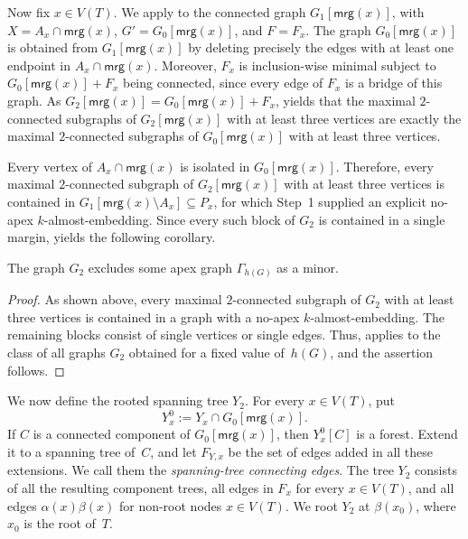 \documentclass[1p,number,11pt]{elsarticle}
\theoremstyle{plain}
\newcommand{\mrg}{\mathsf{mrg}}
\begin{document}
Now fix $x\in V(T)$.
We apply  to the connected graph $G_1[\mrg(x)]$, with $X=A_x\cap\mrg(x)$, $G'=G_0[\mrg(x)]$, and $F=F_x$.
The graph $G_0[\mrg(x)]$ is obtained from $G_1[\mrg(x)]$ by deleting precisely the edges with at least one endpoint in $A_x\cap\mrg(x)$.
Moreover, $F_x$ is inclusion-wise minimal subject to $G_0[\mrg(x)]+F_x$ being connected, since every edge of $F_x$ is a bridge of this graph.
As $G_2[\mrg(x)]=G_0[\mrg(x)]+F_x$,  yields that the maximal $2$-connected subgraphs of $G_2[\mrg(x)]$ with at least three vertices are exactly the maximal $2$-connected subgraphs of $G_0[\mrg(x)]$ with at least three vertices.

Every vertex of $A_x\cap\mrg(x)$ is isolated in $G_0[\mrg(x)]$.
Therefore, every maximal $2$-connected subgraph of $G_2[\mrg(x)]$ with at least
three vertices is contained in $G_1[\mrg(x)\setminus A_x]\subseteq P_x$,
for which Step~1 supplied
an explicit no-apex $k$-almost-embedding. Since every such block of $G_2$ is
contained in a single margin,  yields the following corollary.

\begin{corollary}\label{crl:G_2-excludes-apex}
The graph $G_2$ excludes some apex graph $\Gamma_{h(G)}$ as a minor.
\end{corollary}

\begin{proof}
As shown above, every maximal $2$-connected subgraph of $G_2$ with at least
three vertices is contained in a graph with a no-apex $k$-almost-embedding.
The remaining blocks consist of single vertices or single edges.
Thus,  applies to the class of all graphs $G_2$ obtained for
a fixed value of~$h(G)$, and the assertion follows.
\end{proof}

We now define the rooted spanning tree $Y_2$.  For every $x\in V(T)$, put
\[
   Y_x^0:=Y_x\cap G_0[\mrg(x)].
\]
If $C$ is a connected component of $G_0[\mrg(x)]$, then $Y_x^0[C]$ is a
forest.  Extend it to a spanning tree of~$C$, and let $F_{Y,x}$ be the set of
edges added in all these extensions.  We call them the \emph{spanning-tree
connecting edges}.  The tree $Y_2$ consists of all the resulting component
trees, all edges in $F_x$ for every $x\in V(T)$, and all edges
$\alpha(x)\beta(x)$ for non-root nodes $x\in V(T)$.  We root $Y_2$ at
$\beta(x_0)$, where $x_0$ is the root of~$T$.
\end{document}
